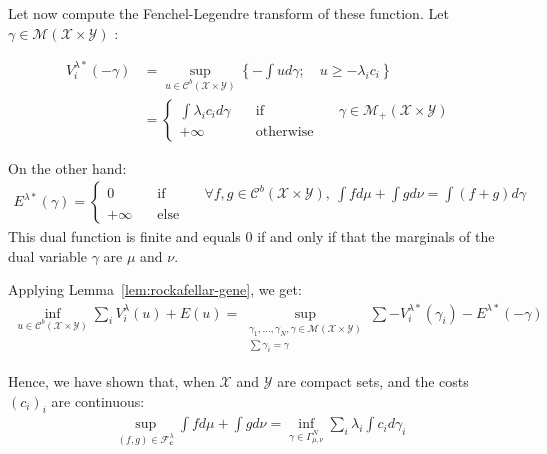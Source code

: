 \begin{prv*}
Let now compute the Fenchel-Legendre transform of these function.  Let $\gamma\in \mathcal{M}(\mathcal{X}\times\mathcal{Y})$ :

\begin{align*}
V^{\lambda*}_i(-\gamma) &= \sup_{u\in \mathcal{C}^b(\mathcal{X}\times\mathcal{Y})}\left\{-\int ud\gamma;\quad u\geq-\lambda_i c_i\right\}
\\
& = \left\{\begin{matrix}\int \lambda_i c_i d\gamma &\quad\text{if} \quad& \gamma\in\mathcal{M}_+(\mathcal{X}\times\mathcal{Y}) \\
+\infty &\quad\text{otherwise}\quad& \end{matrix}\right.
\end{align*}

On  the other hand:
\begin{align*}
E^{\lambda*}(\gamma)=\left\{\begin{matrix} 0 &\quad\text{if}\quad& \forall f,g\in \mathcal{C}^b(\mathcal{X}\times\mathcal{Y}),~ \int fd\mu+\int gd\nu  = \int (f+g)d\gamma\\
+\infty &\quad\text{else}\quad&\end{matrix}\right.
\end{align*}
This dual function is finite and equals $0$ if and only if that the marginals of the dual variable $\gamma$ are $\mu$ and $\nu$. 

Applying Lemma~\ref{lem:rockafellar-gene}, we get:
\begin{align*}
\inf_{u\in \mathcal{C}^b(\mathcal{X}\times\mathcal{Y})} \sum_i V^{\lambda}_i(u)+E(u) = \sup\limits_{\substack{\gamma_1,...,\gamma_N,\gamma\in \mathcal{M}(\mathcal{X}\times\mathcal{Y})\\\sum\gamma_i=\gamma}}\sum -V^{\lambda*}_i(\gamma_i)-E^{\lambda*}(-\gamma)
\end{align*}



Hence, we  have shown that, when $\mathcal{X}$ and $\mathcal{Y}$ are compact sets, and  the costs $(c_i)_i$ are continuous:
\begin{align*}
\sup\limits_{(f,g)\in\mathcal{F}^\lambda_\mathbf{c}}\int fd\mu+\int gd\nu = \inf\limits_{\gamma\in\Gamma^N_{\mu,\nu}}\sum_i\lambda_i \int c_id\gamma_i
\end{align*}




\end{prv*}
